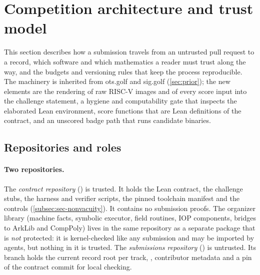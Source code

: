 \section{Competition architecture and trust model}\label{sec:architecture}

This section describes how a submission travels from an untrusted pull request to a record, which
software and which mathematics a reader must trust along the way, and the budgets and versioning
rules that keep the process reproducible. The machinery is inherited from ots.golf and sig.golf
(\cref{sec:prior}); the new elements are the rendering of raw RISC-V images and of every score
input into the challenge statement, a hygiene and computability gate that inspects the elaborated
Lean environment, score functions that are Lean definitions of the contract, and an unscored badge
path that runs candidate binaries.

\subsection{Repositories and roles}\label{subsec:arch-repos}

\paragraph{Two repositories.} The \emph{contract repository} () is trusted. It
holds the Lean contract, the challenge stubs, the harness and verifier scripts, the pinned
toolchain manifest and the controls (\cref{subsec:sec-nonvacuity}). It contains no submission
proofs. The organizer library (machine facts, symbolic executor, field routines, IOP components,
bridges to ArkLib and CompPoly) lives in the same repository as a separate package that is
\emph{not} protected: it is kernel-checked like any submission and may be imported by agents, but
nothing in it is trusted. The \emph{submissions repository} () is
untrusted. Its  branch holds the current record root per track, ,
contributor metadata and a pin of the contract commit for local checking.

